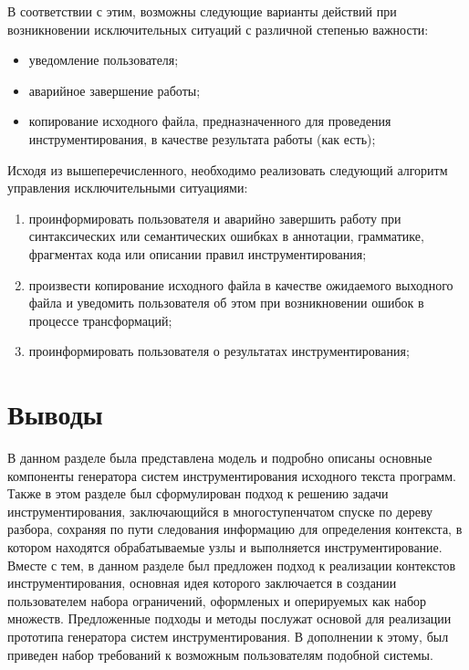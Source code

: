 В соответствии с этим, возможны следующие варианты действий при возникновении исключительных ситуаций с различной степенью важности:

\begin{itemize}[noitemsep]
  \item уведомление пользователя;
  \item аварийное завершение работы;
  \item копирование исходного файла, предназначенного для проведения инструментирования, в качестве результата работы (как есть);
\end{itemize}

Исходя из вышеперечисленного, необходимо реализовать следующий алгоритм управления исключительными ситуациями:
\begin{enumerate}[noitemsep]
  \item проинформировать пользователя и аварийно завершить работу при синтаксических или семантических ошибках в аннотации, грамматике, фрагментах кода или описании правил инструментирования;
  \item произвести копирование исходного файла в качестве ожидаемого выходного файла и уведомить пользователя об этом при возникновении ошибок в процессе трансформаций;
  \item проинформировать пользователя о результатах инструментирования;
\end{enumerate}

\section{Выводы}

В данном разделе была представлена модель и подробно описаны основные компоненты генератора систем инструментирования исходного текста программ.
Также в этом разделе был сформулирован подход к решению задачи инструментирования, заключающийся в многоступенчатом спуске по дереву разбора, сохраняя по пути следования информацию для определения контекста, в котором находятся обрабатываемые узлы и выполняется инструментирование.
Вместе с тем, в данном разделе был предложен подход к реализации контекстов инструментирования, основная идея которого заключается в создании пользователем набора ограничений, оформленых и оперируемых как набор множеств.
Предложенные подходы и методы послужат основой для реализации прототипа генератора систем инструментирования.
В дополнении к этому, был приведен набор требований к возможным пользователям подобной системы.
